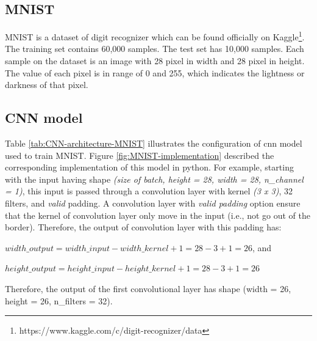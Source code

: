 \documentclass[12pt]{article}
\begin{document}
\subsection{MNIST}
MNIST is a dataset of digit recognizer which can be found officially on Kaggle\footnote{https://www.kaggle.com/c/digit-recognizer/data}. The training set contains 60,000 samples. The test set has 10,000 samples.  Each sample on the dataset is an image with 28 pixel in width and 28 pixel in height. The value of each pixel is in range of 0 and 255, which indicates the lightness or darkness of that pixel.


\subsection{CNN model}
Table \ref{tab:CNN-architecture-MNIST} illustrates the configuration of \gls{cnn} model used to train MNIST. Figure \ref{fig:MNIST-implementation} described the corresponding implementation of this model in python. For example, starting with the input having shape \textit{(size of batch, height = 28, width = 28, n\_channel = 1)}, this input is passed through a convolution layer with kernel \textit{(3 x 3)}, 32 filters, and \textit{valid} padding. A convolution layer with \textit{valid padding} option ensure that the kernel of convolution layer only move in the input (i.e., not go out of the border). Therefore, the output of convolution layer with this padding has:
\begin{center}
	$width\_output = width\_input - width\_kernel + 1 = 28 - 3 + 1 = 26$, and
	
	$height\_output = height\_input - height\_kernel + 1  = 28 - 3 + 1 = 26$
\end{center}

Therefore, the output of the first convolutional layer has shape (width = 26, height = 26, n\_filters = 32).
\end{document}
